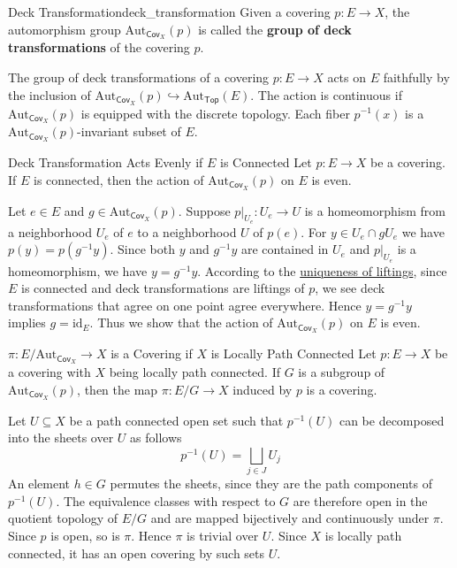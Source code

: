 \documentclass{report}
\begin{document}
\begin{definition}{Deck Transformation}{deck_transformation}
	Given a covering $p: E \rightarrow X$, the automorphism group $\mathrm{Aut}_{\mathsf{Cov}_X}(p)$ is called the \textbf{group of deck transformations} of the covering $p$. 
\end{definition}

The group of deck transformations of a covering $p: E \rightarrow X$ acts on $E$ faithfully by the inclusion of $\mathrm{Aut}_{\mathsf{Cov}_X}(p)\hookrightarrow\mathrm{Aut}_{\mathsf{Top}}(E)$. The action is continuous if $\mathrm{Aut}_{\mathsf{Cov}_X}(p)$ is equipped with the discrete topology. Each fiber $p^{-1}(x)$ is a $\mathrm{Aut}_{\mathsf{Cov}_X}(p)$-invariant subset of $E$.

\begin{proposition}{Deck Transformation Acts Evenly if $E$ is Connected}{}
	Let $p: E \rightarrow X$ be a covering. If $E$ is connected, then the action of $\mathrm{Aut}_{\mathsf{Cov}_X}(p)$ on $E$ is even.
\end{proposition}
\begin{prf}
	Let $e \in E$ and $g \in \mathrm{Aut}_{\mathsf{Cov}_X}(p)$. Suppose $p|_{U_e}:U_e\to U$ is a homeomorphism from a neighborhood $U_e$ of $e$ to a neighborhood $U$ of $p(e)$. For $y \in U_e \cap g U_e$ we have $p(y)=p\left(g^{-1} y\right)$. Since both $y$ and $g^{-1} y$ are contained in $U_e$ and $p|_{U_e}$ is a homeomorphism, we have $y=g^{-1} y$. According to the \hyperref[th:uniqueness_of_liftings]{uniqueness of liftings}, since $E$ is connected and deck transformations are liftings of $p$, we see deck transformations that agree on one point agree everywhere. Hence $y=g^{-1} y$ implies $g=\mathrm{id}_{E}$. Thus we show that the action of $\mathrm{Aut}_{\mathsf{Cov}_X}(p)$ on $E$ is even.
	
\end{prf}

\begin{proposition}{$\pi: E / \mathrm{Aut}_{\mathsf{Cov}_X} \rightarrow X$ is a Covering if $X$ is Locally Path Connected}{}
	Let $p: E \rightarrow X$ be a covering with $X$ being locally path connected. If $G$ is a subgroup of $\mathrm{Aut}_{\mathsf{Cov}_X}(p)$, then the map $\pi: E / G \rightarrow X$ induced by $p$ is a covering.
\end{proposition}
\begin{prf}
	Let $U \subseteq X$ be a path connected open set such that $p^{-1}(U)$ can be decomposed into the sheets over $U$ as follows
	$$
	p^{-1}(U)=\bigsqcup_{j \in J} U_j
	$$
	An element $h \in G$ permutes the sheets, since they are the path components of $p^{-1}(U)$. The equivalence classes with respect to $G$ are therefore open in the quotient topology of $E / G$ and are mapped bijectively and continuously under $\pi$. Since $p$ is open, so is $\pi$. Hence $\pi$ is trivial over $U$. Since $X$ is locally path connected, it has an open covering by such sets $U$.
\end{prf}
\end{document}
